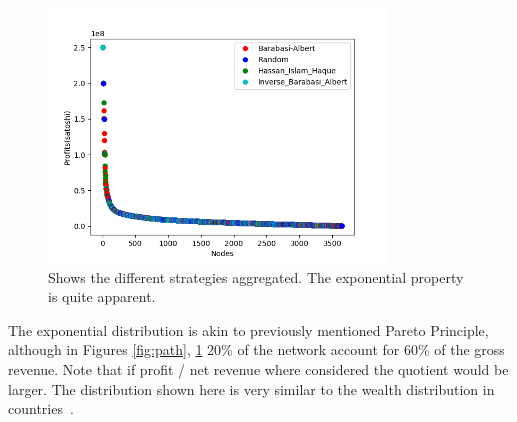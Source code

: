 \begin{figure}[!htb]
	\vspace{-3cm}
	\centering
	\includegraphics[width=9cm]{images/wealth_distribution_same.png}
	\caption{ Shows the different strategies aggregated. The exponential property is quite apparent.  
	}
	\label{fig:same}
	\hspace*{2mm} 
\end{figure}

The exponential distribution is akin to previously mentioned Pareto Principle, although in Figures \ref{fig:path}, \ref{fig:same} 20\% of the network account for 60\% of the gross revenue. Note that if profit / net revenue where considered the quotient would be larger. The distribution shown here is very similar to the wealth distribution in countries~\cite{credit:swiss:distribution}.

